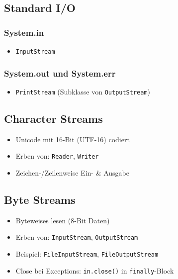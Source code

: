 \subsection{Standard I/O}
\vspace{-0.7\abovedisplayskip}
\begin{minipage}[t]{0.4\columnwidth}
    \subsubsection{\textsf{System.in}}
    \begin{itemize}
        \item \lstinline{InputStream}
    \end{itemize}
\end{minipage}\hfill%
\begin{minipage}[t]{0.59\columnwidth}
    \subsubsection{\textsf{System.out} und \textsf{System.err}}
    \begin{itemize}
        \item \lstinline{PrintStream} (Subklasse von \lstinline{OutputStream})
    \end{itemize}
\end{minipage}


\begin{minipage}[t]{0.38\columnwidth}
    \subsection{Character Streams}
    \raggedright%
    \begin{itemize}
        \item Unicode mit 16-Bit (UTF-16) codiert
        \item Erben von: \lstinline{Reader}, \lstinline{Writer}
        \item Zeichen-/Zeilenweise Ein- \& Ausgabe
    \end{itemize}
\end{minipage}\hfill%
\begin{minipage}[t]{0.61\columnwidth}
    \subsection{Byte Streams}
    \raggedright%
    \begin{itemize}
        \item Byteweises lesen (8-Bit Daten)
        \item Erben von: \lstinline{InputStream}, \lstinline{OutputStream}
        \item Beispiel: \lstinline{FileInputStream}, \lstinline{FileOutputStream}
        \item Close bei Exceptions: \lstinline{in.close()} in \lstinline{finally}-Block
    \end{itemize}
\end{minipage}


